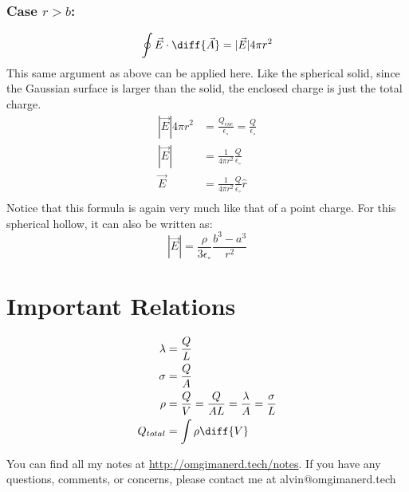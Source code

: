 \documentclass{math}
\begin{document}
\subsubsection*{Case \( r > b \):}
\begin{center}
\end{center}
\[ \oint\vec{E}\cdot\diff{\vec{A}} = |\vec{E}|4\pi r^2 \]
This same argument as above can be applied here. Like the spherical solid, since
the Gaussian surface is larger than the solid, the enclosed charge is just the
total charge.
\begin{align*}
  |\vec{E}|4\pi r^2 &= \frac{Q_{enc}}{\epsilon_{\circ}} =
    \frac{Q}{\epsilon_{\circ}} \\
  |\vec{E}| &= \frac{1}{4\pi r^2}\frac{Q}{\epsilon_{\circ}} \\
  \vec{E} &= \frac{1}{4\pi r^2}\frac{Q}{\epsilon_{\circ}}\hat{r} \\
\end{align*}
Notice that this formula is again very much like that of a point charge. For
this spherical hollow, it can also be written as:
\[ |\vec{E}| = \frac{\rho}{3\epsilon_{\circ}}\frac{b^3-a^3}{r^2} \]

\section*{Important Relations}
\begin{align*}
  \lambda &= \frac{Q}{L} \\
  \sigma &= \frac{Q}{A} \\
  \rho &= \frac{Q}{V} = \frac{Q}{AL} = \frac{\lambda}{A} = \frac{\sigma}{L} \\
  Q_{total} &= \int\rho\diff{V}
\end{align*}

\begin{center}
  You can find all my notes at \url{http://omgimanerd.tech/notes}. If you have
  any questions, comments, or concerns, please contact me at
  alvin@omgimanerd.tech
\end{center}
\end{document}
